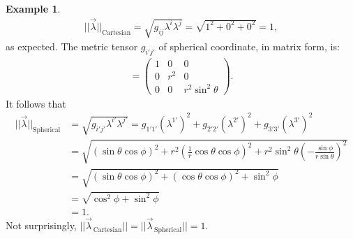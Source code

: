 \documentclass{article}
\theoremstyle{definition}
\newtheorem{exmp}{Example}[section]
\begin{document}
\begin{exmp}
	\begin{align*}
	\vert\vert \vec{\lambda} \vert\vert_{\text{Cartesian}} = \sqrt{g_{ij}\lambda^i\lambda^j} = \sqrt{1^2 + 0^2 + 0^2} = 1,
	\end{align*}
	as expected. The metric tensor $g_{i'j'}$ of spherical coordinate, in matrix form, is:
	\begin{align*}
	[g_{i'j'}] = \begin{pmatrix}
	1 & 0 & 0\\
	0 & r^2 & 0\\
	0 & 0 & r^2\sin^2\theta
	\end{pmatrix}.
	\end{align*}
	It follows that
	\begin{align*}
	\vert\vert \vec{\lambda} \vert\vert_{\text{Spherical}} &= \sqrt{g_{i'j'}\lambda^{i'}\lambda^{j'}} = g_{1'1'}\left( \lambda^{1'}\right) ^2 + g_{2'2'}\left( \lambda^{2'}\right) ^2 + g_{3'3'}\left( \lambda^{3'}\right) ^2\\
	&= \sqrt{\left( \sin\theta\cos\phi\right)^2 + r^2\left(\frac{1}{r}\cos\theta\cos\phi \right)^2 + r^2\sin^2\theta\left(-\frac{\sin\phi}{r\sin\theta} \right)^2  }\\
	&= \sqrt{\left( \sin\theta\cos\phi\right)^2 + \left(\cos\theta\cos\phi \right)^2 + \sin^2\phi}\\
	&= \sqrt{\cos^2\phi + \sin^2\phi}\\
	&= 1.
	\end{align*}
	Not surprisingly, $\vert\vert \vec{\lambda}_{\,\text{Cartesian}} \vert\vert = \vert\vert \vec{\lambda}_{\,\text{Spherical}} \vert\vert = 1$.
\end{exmp}
\end{document}
